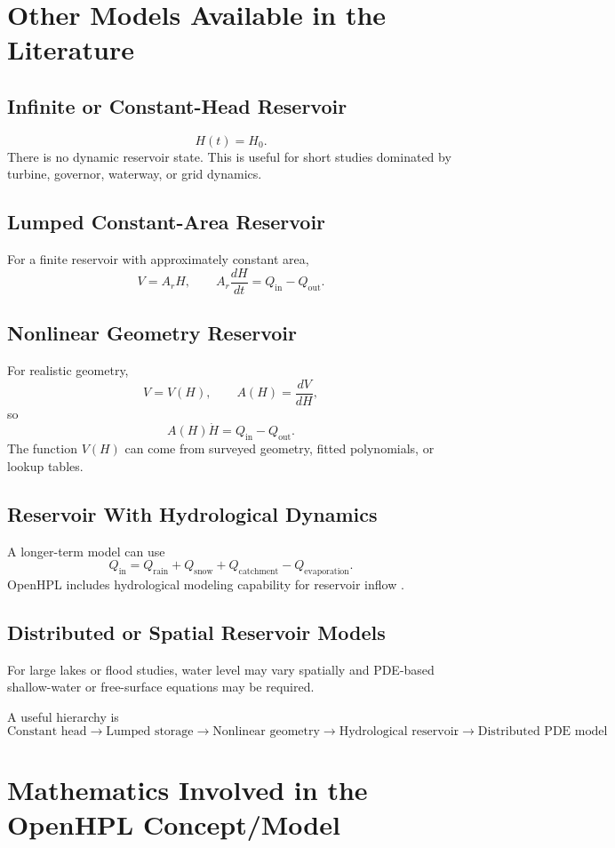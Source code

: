 \documentclass[11pt,a4paper]{article}
\begin{document}
\section{Other Models Available in the Literature}
\subsection{Infinite or Constant-Head Reservoir}
\[
H(t)=H_0.
\]
There is no dynamic reservoir state. This is useful for short studies dominated by turbine, governor, waterway, or grid dynamics.

\subsection{Lumped Constant-Area Reservoir}
For a finite reservoir with approximately constant area,
\[
V=A_rH,
\qquad
A_r\frac{dH}{dt}=Q_{\mathrm{in}}-Q_{\mathrm{out}}.
\]

\subsection{Nonlinear Geometry Reservoir}
For realistic geometry,
\[
V=V(H),\qquad
A(H)=\frac{dV}{dH},
\]
so
\[
A(H)\dot H=Q_{\mathrm{in}}-Q_{\mathrm{out}}.
\]
The function $V(H)$ can come from surveyed geometry, fitted polynomials, or lookup tables.

\subsection{Reservoir With Hydrological Dynamics}
A longer-term model can use
\[
Q_{\mathrm{in}}=Q_{\mathrm{rain}}+Q_{\mathrm{snow}}+Q_{\mathrm{catchment}}-Q_{\mathrm{evaporation}}.
\]
OpenHPL includes hydrological modeling capability for reservoir inflow \cite{OpenHPLUserGuide}.

\subsection{Distributed or Spatial Reservoir Models}
For large lakes or flood studies, water level may vary spatially and PDE-based shallow-water or free-surface equations may be required.

A useful hierarchy is
\[
\boxed{\text{Constant head}\rightarrow\text{Lumped storage}\rightarrow\text{Nonlinear geometry}\rightarrow\text{Hydrological reservoir}\rightarrow\text{Distributed PDE model}}.
\]

\section{Mathematics Involved in the OpenHPL Concept/Model}
\end{document}
